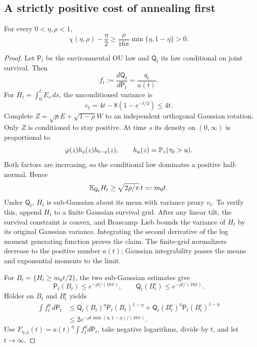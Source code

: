 \subsection{A strictly positive cost of annealing first}
\begin{theorem}\label{fp:thm:annealing}
For every $0<\eta,\rho<1$,
\begin{equation}\label{fp:eq:annealing-loss}
 \chi(\eta,\rho)-\frac\eta2
 \ge\frac{\rho}{16\pi}\min\{\eta,1-\eta\}>0.
\end{equation}
\end{theorem}
\begin{proof}
Let $\mathsf P_t$ be the environmental OU law and $\mathsf Q_t$ its law conditional on joint survival. Then
\[
 f_t:=\frac{d\mathsf Q_t}{d\mathsf P_t}=\frac{q_t}{a(t)}.
\]
For $H_t=\int_0^tE_s\,ds$, the unconditioned variance is
\[
 v_t=4t-8(1-e^{-t/2})\le4t.
\]
Complete $Z=\sqrt\rho E+\sqrt{1-\rho}W$ to an independent orthogonal Gaussian rotation. Only $Z$ is conditioned to stay positive. At time $s$ its density on $(0,\infty)$ is proportional to
\[
 \varphi(z)h_s(z)h_{t-s}(z),\qquad h_u(z)=\mathbb P_z(\tau_0>u).
\]
Both factors are increasing, so the conditional law dominates a positive half-normal. Hence
\[
 \mathbb E_{\mathsf Q_t}H_t\ge\sqrt{2\rho/\pi}\,t=:m_0t.
\]
Under $\mathsf Q_t$, $H_t$ is sub-Gaussian about its mean with variance proxy $v_t$. To verify this, append $H_t$ to a finite Gaussian survival grid. After any linear tilt, the survival constraint is convex, and Brascamp--Lieb bounds the variance of $H_t$ by its original Gaussian variance. Integrating the second derivative of the log moment generating function proves the claim. The finite-grid normalizers decrease to the positive number $a(t)$; Gaussian integrability passes the means and exponential moments to the limit.

For $B_t=\{H_t\ge m_0t/2\}$, the two sub-Gaussian estimates give
\[
 \mathsf P_t(B_t)\le e^{-\rho t/(16\pi)},\qquad
 \mathsf Q_t(B_t^c)\le e^{-\rho t/(16\pi)}.
\]
H\"older on $B_t$ and $B_t^c$ yields
\begin{align*}
 \int f_t^\eta\,d\mathsf P_t
 &\le\mathsf Q_t(B_t)^\eta\mathsf P_t(B_t)^{1-\eta}
   +\mathsf Q_t(B_t^c)^\eta\mathsf P_t(B_t^c)^{1-\eta}\\
 &\le2e^{-\rho t\min(\eta,1-\eta)/(16\pi)}.
\end{align*}
Use $F_{\eta,\rho}(t)=a(t)^\eta\int f_t^\eta d\mathsf P_t$, take negative logarithms, divide by $t$, and let $t\to\infty$.
\end{proof}

